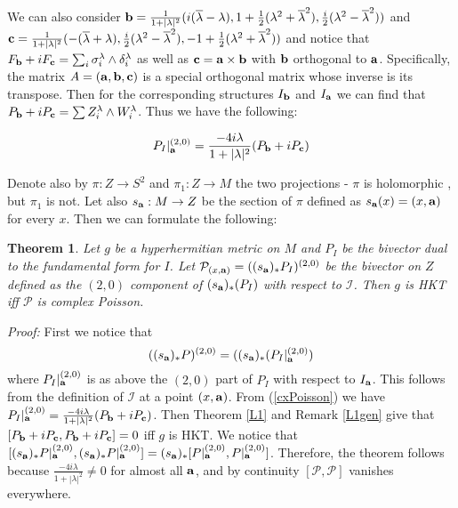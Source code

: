 \documentclass[11pt,oneside,leqno]{amsart}
\theoremstyle{plain}
\newtheorem{theorem}{Theorem}[section]
\theoremstyle{definition}
\begin{document}
We can also consider ${\bf b} = \frac{1}{1+|\lambda|^2}(i(\overline{\lambda}-\lambda), 1+\frac{1}{2}(\lambda^2+\overline{\lambda}^2), \frac{i}{2}(\lambda^2-\overline{\lambda}^2))$ and ${\bf c} = \frac{1}{1+|\lambda|^2}(-(\overline{\lambda}+\lambda), \frac{i}{2}(\lambda^2-\overline{\lambda}^2), -1+\frac{1}{2}(\lambda^2+\overline{\lambda}^2) )$ and notice that $F_{\bf b} + iF_{\bf c} = \sum_i \sigma_i^{\lambda}\wedge\delta_i^{\lambda}$ as well as ${\bf c} = {\bf a}\times{\bf b}$
with ${\bf b}$ orthogonal to ${\bf a}$. Specifically, the matrix $A = ({\bf a}, {\bf b}, {\bf c})$ is a special orthogonal matrix whose inverse is its transpose. Then for the corresponding structures $I_{\bf b}$ and $I_{\bf a}$ we can find that $P_{\bf b} + iP_{\bf c} = \sum Z_i^{\lambda}\wedge W_i^{\lambda}$. Thus we have the following:

\begin{equation}\label{cxPoisson}
P_I|^{(2,0)}_{\bf a} = \frac{-4i\lambda}{1+|\lambda|^2}(P_{\bf b} +iP_{\bf c})
\end{equation}

Denote also by $\pi: Z\rightarrow S^2$ and $\pi_1:Z\rightarrow M$ the two projections - $\pi$ is holomorphic , but $\pi_1$ is not. Let also $s_{\bf a}:M\rightarrow Z$ be the section of $\pi$ defined as $s_{\bf a}(x) = (x,{\bf a})$ for every $x$. Then we can formulate the following:

\begin{theorem}\label{L4}
Let $g$ be a hyperhermitian metric on $M$ and $P_I$ be the bivector dual to the fundamental form for $I$. Let $\mathcal{P}_{(x,{\bf a})} = ((s_{\bf a})_*P_I)^{(2,0)}$ be the bivector on $Z$ defined  as the $(2,0)$ component of $(s_{\bf a})_*(P_I)$ with respect to $\mathcal{I}$.  Then $g$ is HKT iff $\mathcal{P}$ is complex Poisson.
\end{theorem}

{\it Proof:}
  First we notice that $$((s_{\bf a})_*P)^{(2,0)} = ((s_{\bf a})_*(P_I|^{(2,0)}_{\bf a})$$ where $P_I|^{(2,0)}_{\bf a}$ is as above the $(2,0)$ part of $P_I$ with respect to $I_{\bf a}$. This follows from the definition of $\mathcal{I}$ at a point $(x,{\bf a})$. From (\ref{cxPoisson}) we have  $P_I|^{(2,0)}_{\bf a} = \frac{-4i\lambda}{1+|\lambda|^2} (P_{\bf b} + iP_{\bf c})$. Then Theorem \ref{L1} and Remark \ref{L1gen} give that $[P_{\bf b} + iP_{\bf c},P_{\bf b} + iP_{\bf c}] = 0$ iff $g$ is HKT. We notice that $[(s_{\bf a})_*P|^{(2,0)}_{\bf a}, (s_{\bf a})_*P|^{(2,0)}_{\bf a}] = (s_{\bf a})_*[P|^{(2,0)}_{\bf a},P|^{(2,0)}_{\bf a}]$. Therefore, the theorem follows because $\frac{-4i\lambda}{1+|\lambda|^2}\neq 0$ for almost all ${\bf a}$, and by continuity $[\mathcal{P},\mathcal{P}]$ vanishes everywhere.
\end{document}
